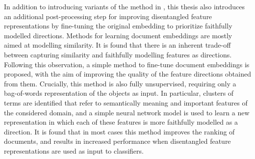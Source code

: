 \documentclass[a4paper,oneside,onecolumn,openright,12pt]{book}
\begin{document}

 In addition to introducing variants of the method in \cite{Derrac2015}, this thesis also introduces an additional post-processing step for improving disentangled feature representations by fine-tuning the original embedding to prioritize faithfully modelled directions. Methods for learning document embeddings  are mostly aimed at modelling similarity. It is found  that there is an inherent trade-off between capturing similarity and faithfully modelling features as directions. Following this observation, a simple method to fine-tune  document embeddings is proposed, with the aim of improving the quality of the feature directions obtained from them. Crucially, this  method is also fully unsupervised, requiring only a bag-of-words representation of the objects as input.  In particular,  clusters of terms are identified that refer to semantically meaning and important features of the considered domain, and a simple neural network model is used to learn a new representation in which each of these features is more faithfully modelled as a direction. It is found that in most cases this method improves the ranking of documents, and results in increased performance when disentangled feature representations are used as input to classifiers. %






\end{document}
